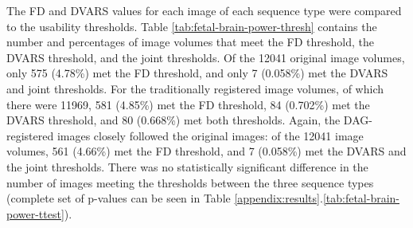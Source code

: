 The FD and DVARS values for each image of each sequence type were compared to the usability thresholds. Table \ref{tab:fetal-brain-power-thresh} contains the number and percentages of image volumes that meet the FD threshold, the DVARS threshold, and the joint thresholds. Of the 12041 original image volumes, only 575 (4.78\%) met the FD threshold, and only 7 (0.058\%) met the DVARS and joint thresholds. For the traditionally registered image volumes, of which there were 11969, 581 (4.85\%) met the FD threshold, 84 (0.702\%) met the DVARS threshold, and 80 (0.668\%) met both thresholds. Again, the DAG-registered images closely followed the original images: of the 12041 image volumes, 561 (4.66\%) met the FD threshold, and 7 (0.058\%) met the DVARS and the joint thresholds. There was no statistically significant difference in the number of images meeting the thresholds between the three sequence types (complete set of p-values can be seen in Table \ref{appendix:results}.\ref{tab:fetal-brain-power-ttest}).

